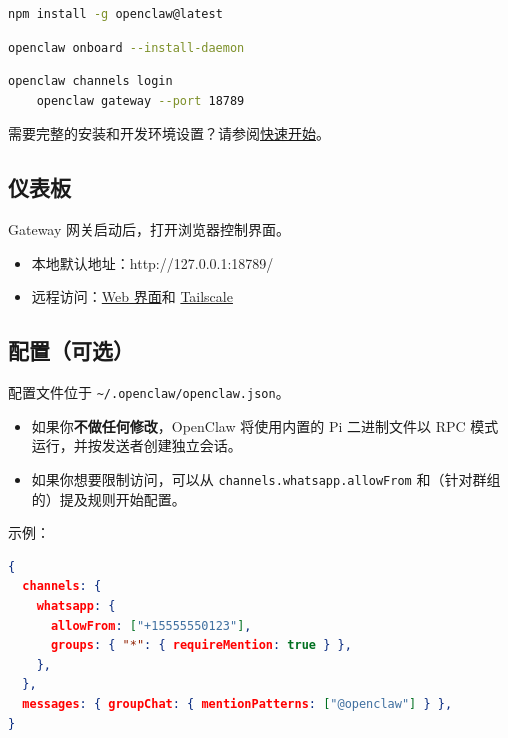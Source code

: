 \begin{lstlisting}[language=bash]
    npm install -g openclaw@latest
\end{lstlisting}

\begin{lstlisting}[language=bash]
    openclaw onboard --install-daemon
\end{lstlisting}

\begin{lstlisting}[language=bash]
    openclaw channels login
    openclaw gateway --port 18789
\end{lstlisting}


需要完整的安装和开发环境设置？请参阅\href{/start/quickstart}{快速开始}。

\subsection{仪表板}


Gateway 网关启动后，打开浏览器控制界面。

\begin{itemize}
  \item 本地默认地址：http://127.0.0.1:18789/
  \item 远程访问：\href{/web}{Web 界面}和 \href{/gateway/tailscale}{Tailscale}
\end{itemize}



\subsection{配置（可选）}


配置文件位于 \texttt{\textasciitilde{}/.openclaw/openclaw.json}。

\begin{itemize}
  \item 如果你\textbf{不做任何修改}，OpenClaw 将使用内置的 Pi 二进制文件以 RPC 模式运行，并按发送者创建独立会话。
  \item 如果你想要限制访问，可以从 \texttt{channels.whatsapp.allowFrom} 和（针对群组的）提及规则开始配置。
\end{itemize}


示例：

\begin{lstlisting}[language=json]
{
  channels: {
    whatsapp: {
      allowFrom: ["+15555550123"],
      groups: { "*": { requireMention: true } },
    },
  },
  messages: { groupChat: { mentionPatterns: ["@openclaw"] } },
}
\end{lstlisting}


